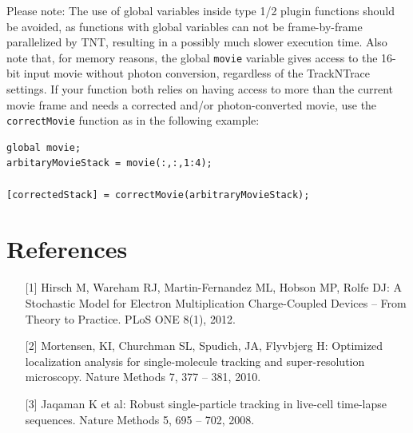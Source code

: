 \documentclass[11pt,onside]{report}
\numberwithin{equation}{chapter}
\begin{document}
Please note: The use of global variables inside type 1/2 plugin functions should be avoided, as functions with global variables can not be frame-by-frame parallelized by TNT, resulting in a possibly much slower execution time. Also note that, for memory reasons, the global \texttt{movie} variable gives access to the 16-bit input movie without photon conversion, regardless of the TrackNTrace settings. If your function both relies on having access to more than the current movie frame and needs a corrected and/or photon-converted movie, use the \texttt{correctMovie} function as in the following example:
\begin{lstlisting}[style=Matlab-editor]
global movie;
arbitaryMovieStack = movie(:,:,1:4);

[correctedStack] = correctMovie(arbitraryMovieStack);
\end{lstlisting}

\clearpage

\section{References}
\begin{itemize}
\item [{[1]}]  Hirsch M, Wareham RJ, Martin-Fernandez ML, Hobson MP, Rolfe DJ: A Stochastic Model for Electron Multiplication Charge-Coupled Devices {--} From Theory to Practice. PLoS ONE 8(1), 2012.
\item [{[2]}] Mortensen, KI, Churchman SL, Spudich, JA, Flyvbjerg H: Optimized localization analysis for single-molecule tracking and super-resolution microscopy. Nature Methods 7, 377 {--} 381, 2010.
\item [{[3]}] Jaqaman K et al: Robust single-particle tracking in live-cell time-lapse sequences. Nature Methods 5, 695 {--} 702, 2008.

\end{itemize}
\end{document}
